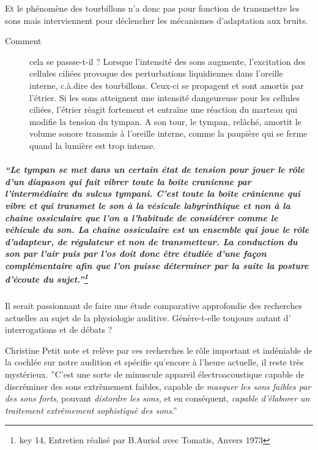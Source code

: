 Et le phénomène des tourbillons n'a donc pas pour fonction de transmettre
les sons mais interviennent pour déclencher les mécanismes d'adaptation
aux bruits. 
\begin{description}
\item [{Comment}] cela se passse-t-il ? Lorsque l'intensité des sons augmente,
l'excitation des cellules ciliées provoque des perturbations liquidiennes
dans l'oreille interne, c.à.dire des tourbillons. Ceux-ci se propagent
et sont amortis par l'étrier. Si les sons atteignent une intensité
dangeureuse pour les cellules ciliées, l'étrier réagit fortement et
entraîne une réaction du marteau qui modifie la tension du tympan.
A son tour, le tympan, relâché, amortit le volume sonore transmis
à l'oreille interne, comme la paupière qui se ferme quand la lumière
est trop intense.
\end{description}

\subparagraph*{``Le tympan se met dans un certain état de tension pour jouer le
rôle d\textquoteright un diapason qui fait vibrer toute la boîte cranienne
par l'intermédiaire du sulcus tympani. \emph{C'est toute la boîte
crânienne qui vibre et qui transmet le son à la vésicule labyrinthique
et non à la chaîne ossiculaire que l'on a l'habitude de considérer
comme le véhicule du son. }La chaîne ossiculaire est un ensemble qui
joue le rôle d'adapteur, de régulateur et non de transmetteur. La
conduction du son par l\textquoteright air puis par l'os doit donc
être étudiée d\textquoteright une façon complémentaire afin que l'on
puisse déterminer par la suite la posture d'écoute du sujet.''\protect\footnote{key 14, Entretien réalisé par B.Auriol avec Tomatis, Anvers 1973}}

Il serait passionnant de faire une étude comparative approfondie des
recherches actuelles au sujet de la physiologie auditive. Génère-t-elle
toujours autant d' interrogations et de débats ?

Christine Petit note et relève par ces recherches le rôle important
et indéniable de la cochlée sur notre audition et spécifie qu'encore
à l'heure actuelle, il reste très mystérieux. 
''C'est une sorte de minuscule appareil électroacoustique capable
de discréminer des sons extrêmement faibles, capable de \emph{masquer
les sons faibles par des sons forts}, pouvant \emph{distordre les
sons,} et en conséquent, \emph{capable d'élaborer un traitement extrêmement
sophistiqué des sons}.''

